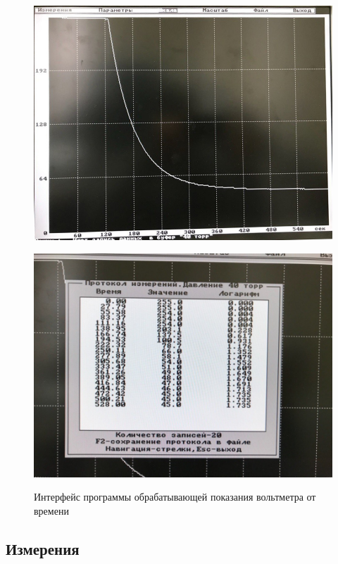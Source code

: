 \documentclass[a4paper,12pt]{article}
\theoremstyle{plain} %
\theoremstyle{definition} %
\theoremstyle{remark} %
\begin{document}
\begin{figure}[H]
\begin{floatrow}

{\includegraphics[width=0.4\linewidth]{comp.jpg}}
\hspace{5ex}

{\includegraphics[width=0.4\linewidth]{comp2.jpg}}

\caption{Интерфейс программы обрабатывающей показания вольтметра от времени}
\end{floatrow}

\end{figure}



\subsection{Измерения}
\end{document}
